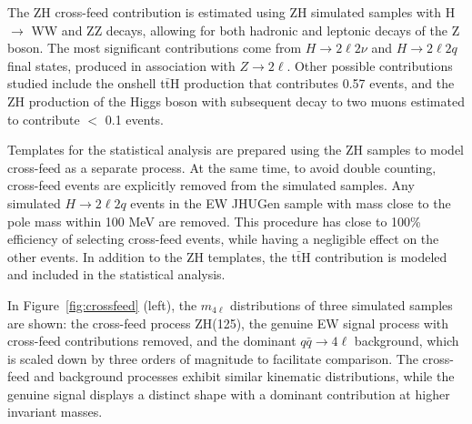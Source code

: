 The ZH cross-feed contribution is estimated using \onshell ZH simulated samples with H $\to$ WW and ZZ decays, allowing for both hadronic and leptonic decays of the Z boson. The most significant contributions come from $H \to 2\ell 2\nu$ and $H \to 2\ell 2q$ final states, produced in association with $Z \to 2\ell$. Other possible contributions studied include the onshell t$\bar{\text{t}}$H production that contributes 0.57 events, and the ZH production of the Higgs boson with subsequent decay to two muons estimated to contribute $<$ 0.1 events. 

Templates for the statistical analysis are prepared using the \onshell ZH samples to model cross-feed
as a separate \onshell process. 
At the same time, to avoid double counting, \onshell cross-feed events are explicitly removed from the \offshell simulated samples.
Any simulated $H\to 2\ell 2q$ events in the \offshell EW JHUGen sample with mass close 
to the \Hboson pole mass within 100 MeV are removed. This procedure has close to 100\%
efficiency of selecting \onshell cross-feed events, while having a negligible effect on the other events. In addition to the ZH templates, the t$\bar{\text{t}}$H contribution is modeled and included in the statistical analysis. 

In Figure~\ref{fig:crossfeed} (left), the $m_{4\ell}$ distributions of three simulated samples are shown: the \onshell cross-feed process ZH(125), the genuine \offshell EW signal process with cross-feed contributions removed, and the dominant $q\bar{q} \to 4\ell$ background, which is scaled down by three orders of magnitude to facilitate comparison. The cross-feed and background processes exhibit similar kinematic distributions, while the genuine \offshell signal displays a distinct shape with a dominant contribution at higher invariant masses.

